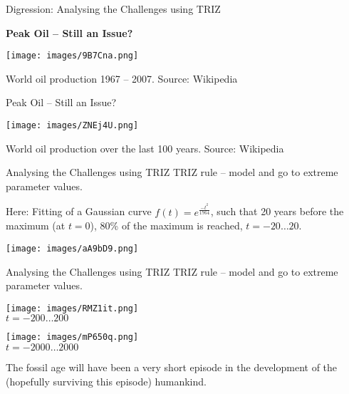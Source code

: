 \documentclass{beamer}
\begin{document}
\begin{frame}{Digression: Analysing the Challenges using TRIZ}

  \begin{center}\large\bf  Peak Oil -- Still an Issue? \end{center}
  
  \begin{center}
    \texttt{[image: images/9B7Cna.png]}
  
    World oil production 1967 -- 2007. Source: Wikipedia
  \end{center}
\end{frame}

\begin{frame}{Peak Oil -- Still an Issue?}

  \begin{center}
    \texttt{[image: images/ZNEj4U.png]}
  
    World oil production over the last 100 years. Source: Wikipedia
  \end{center}
\end{frame}

\begin{frame}{Analysing the Challenges using TRIZ}
  TRIZ rule -- model and go to extreme parameter values.

  Here: Fitting of a Gaussian curve $f(t)=e^{\frac{-t^2}{1764}}$, such that 20
  years before the maximum (at $t=0$), 80\% of the maximum is reached,
  $t=-20\ldots20$.
  \begin{center}
    \texttt{[image: images/aA9bD9.png]}
  \end{center}
\end{frame}

\begin{frame}{Analysing the Challenges using TRIZ}
  TRIZ rule -- model and go to extreme parameter values.
  \begin{center}
    \begin{minipage}{.45\textwidth}\centering
      \texttt{[image: images/RMZ1it.png]}\\
      $t=-200\ldots200$
    \end{minipage}    \hfill
    \begin{minipage}{.45\textwidth}\centering
    \texttt{[image: images/mP650q.png]}\\
    $t=-2000\ldots2000$
    \end{minipage}
  \end{center}
  The fossil age will have been a very short episode in the development of the
  (hopefully surviving this episode) humankind.
\end{frame}
\end{document}

